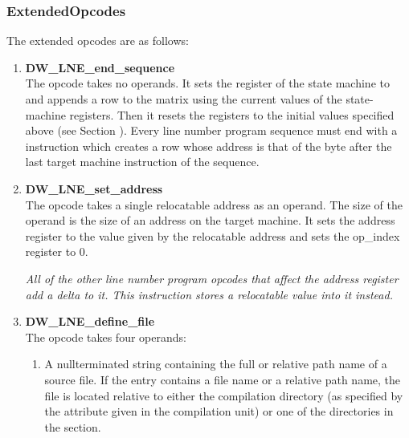 \subsubsection{ExtendedOpcodes}
\label{chap:extendedopcodes}

The extended opcodes are as follows:

\begin{enumerate}[1. ]

\item \textbf{DW\-\_LNE\-\_end\-\_sequence} \\
The  opcode takes no operands. It sets the
register of the state machine to  and
appends a row to the matrix using the current values of the
state-machine registers. Then it resets the registers to the
initial values specified above 
(see Section ). 
Every line
number program sequence must end with a 
instruction which creates a row whose address is that of the
byte after the last target machine instruction of the sequence.

\item \textbf{DW\-\_LNE\-\_set\-\_address} \\
The  opcode takes a single relocatable
address as an operand. The size of the operand is the size
of an address on the target machine. It sets the address
register to the value given by the relocatable address and
sets the op\_index register to 0.

\textit{All of the other line number program opcodes that
affect the address register add a delta to it. This instruction
stores a relocatable value into it instead.}

\item \textbf{DW\-\_LNE\-\_define\-\_file} \\

The  opcode takes four operands:
\begin{enumerate}[1. ]

\item A null\dash terminated string containing the full or relative
path name of a source file. If the entry contains a file
name or a relative path name, the file is located relative
to either the compilation directory (as specified by the
 attribute given in the compilation unit)
or one of the directories in the 
 section.


\end{enumerate}
\end{enumerate}
